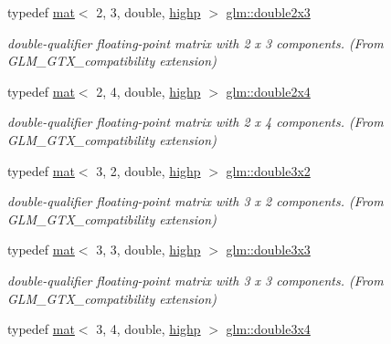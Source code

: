 \begin{DoxyCompactItemize}
typedef \hyperlink{structglm_1_1mat}{mat}$<$ 2, 3, double, \hyperlink{namespaceglm_a36ed105b07c7746804d7fdc7cc90ff25ac6f7eab42eacbb10d59a58e95e362074}{highp} $>$ \hyperlink{group__gtx__compatibility_gaaf4151b4dcb70d412df4c4a1cfccd575}{glm\+::double2x3}
\begin{DoxyCompactList}\small\item\em double-\/qualifier floating-\/point matrix with 2 x 3 components. (From G\+L\+M\+\_\+\+G\+T\+X\+\_\+compatibility extension) \end{DoxyCompactList}\item 
typedef \hyperlink{structglm_1_1mat}{mat}$<$ 2, 4, double, \hyperlink{namespaceglm_a36ed105b07c7746804d7fdc7cc90ff25ac6f7eab42eacbb10d59a58e95e362074}{highp} $>$ \hyperlink{group__gtx__compatibility_ga64a5113afe95db296ff0593232ac772d}{glm\+::double2x4}
\begin{DoxyCompactList}\small\item\em double-\/qualifier floating-\/point matrix with 2 x 4 components. (From G\+L\+M\+\_\+\+G\+T\+X\+\_\+compatibility extension) \end{DoxyCompactList}\item 
typedef \hyperlink{structglm_1_1mat}{mat}$<$ 3, 2, double, \hyperlink{namespaceglm_a36ed105b07c7746804d7fdc7cc90ff25ac6f7eab42eacbb10d59a58e95e362074}{highp} $>$ \hyperlink{group__gtx__compatibility_ga92075f3b0988e062b5fcd25afb67e74c}{glm\+::double3x2}
\begin{DoxyCompactList}\small\item\em double-\/qualifier floating-\/point matrix with 3 x 2 components. (From G\+L\+M\+\_\+\+G\+T\+X\+\_\+compatibility extension) \end{DoxyCompactList}\item 
typedef \hyperlink{structglm_1_1mat}{mat}$<$ 3, 3, double, \hyperlink{namespaceglm_a36ed105b07c7746804d7fdc7cc90ff25ac6f7eab42eacbb10d59a58e95e362074}{highp} $>$ \hyperlink{group__gtx__compatibility_ga7cf33790969e0985a53ff01d914bf8ef}{glm\+::double3x3}
\begin{DoxyCompactList}\small\item\em double-\/qualifier floating-\/point matrix with 3 x 3 components. (From G\+L\+M\+\_\+\+G\+T\+X\+\_\+compatibility extension) \end{DoxyCompactList}\item 
typedef \hyperlink{structglm_1_1mat}{mat}$<$ 3, 4, double, \hyperlink{namespaceglm_a36ed105b07c7746804d7fdc7cc90ff25ac6f7eab42eacbb10d59a58e95e362074}{highp} $>$ \hyperlink{group__gtx__compatibility_gad93d79598c615c80626e270f4357d189}{glm\+::double3x4}

\end{DoxyCompactItemize}
